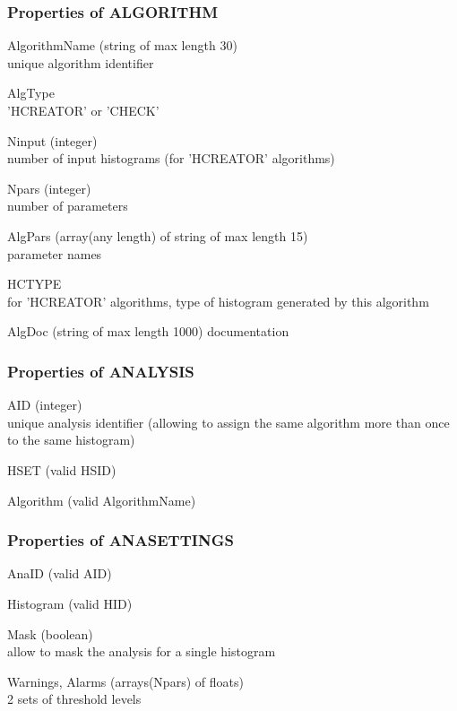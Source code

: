 \documentclass{lhcbnote}
\begin{document}
\subsubsection{Properties of ALGORITHM}
\begin{description}
\item{AlgorithmName} (string of max length 30)\\
unique algorithm identifier
\item{AlgType} \\
'HCREATOR' or 'CHECK'
\item{Ninput} (integer)\\
number of input histograms (for 'HCREATOR' algorithms)
\item{Npars} (integer)\\
number of parameters
\item{AlgPars} (array(any length) of string of max length 15)\\
parameter names
\item{HCTYPE}\\
for 'HCREATOR' algorithms, type of histogram generated by this algorithm 
\item{AlgDoc} (string of max length 1000)
documentation

\end{description}

\subsubsection{Properties of ANALYSIS}
\begin{description}
\item{AID} (integer)\\
unique analysis identifier (allowing to assign the same algorithm more
than once to the same histogram)
\item{HSET}  (valid HSID)
\item{Algorithm}  (valid AlgorithmName)
\end{description}

\subsubsection{Properties of ANASETTINGS}
\begin{description}
\item{AnaID} (valid AID)
\item{Histogram}  (valid HID)
\item{Mask} (boolean)\\
allow to mask the analysis for a single histogram
\item{Warnings, Alarms} (arrays(Npars) of floats)\\
2 sets of threshold levels
\end{description}
\end{document}
